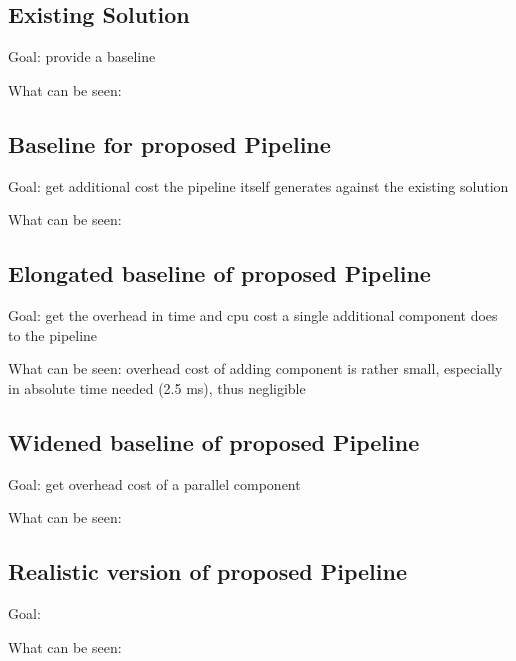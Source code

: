 \subsection{Existing Solution}

Goal: provide a baseline

What can be seen: 

\subsection{Baseline for proposed Pipeline}

Goal: get additional cost the pipeline itself generates against the existing solution

What can be seen: 

\subsection{Elongated baseline of proposed Pipeline}

Goal: get the overhead in time and cpu cost a single additional component does to the pipeline

What can be seen: overhead cost of adding component is rather small, especially in absolute time needed (2.5 ms), thus negligible

\subsection{Widened baseline of proposed Pipeline}

Goal: get overhead cost of a parallel component

What can be seen: 

\subsection{Realistic version of proposed Pipeline}

Goal: 

What can be seen: 
